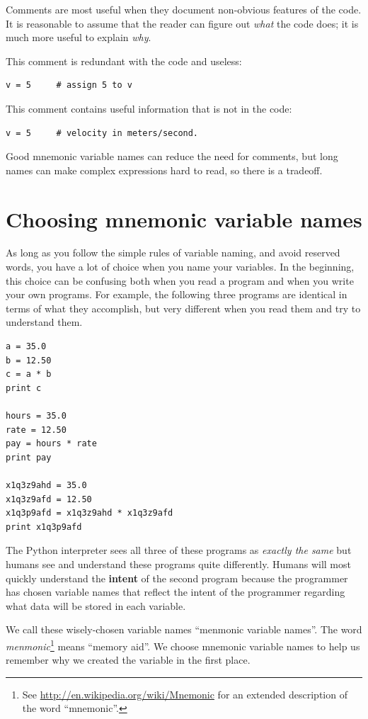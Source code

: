 \documentclass[10pt]{book}
\begin{document}
Comments are most useful when they document non-obvious features of
the code.  It is reasonable to assume that the reader can figure out
{\em what} the code does; it is much more useful to explain {\em why}.

This comment is redundant with the code and useless:

\beforeverb
\begin{verbatim}
v = 5     # assign 5 to v
\end{verbatim}
\afterverb
%
This comment contains useful information that is not in the code:

\beforeverb
\begin{verbatim}
v = 5     # velocity in meters/second. 
\end{verbatim}
\afterverb
%
Good mnemonic variable names can reduce the need for comments, but
long names can make complex expressions hard to read, so there is
a tradeoff.

\section{Choosing mnemonic variable names}


As long as you follow the simple rules of variable naming, and avoid
reserved words, you have a lot of choice when you name your variables.
In the beginning, this choice can be confusing both when you read a 
program and when you write your own programs.  For example, the
following three programs are identical in terms of what they accomplish,
but very different when you read them and try to understand them.

\beforeverb
\begin{verbatim}
a = 35.0
b = 12.50
c = a * b
print c

hours = 35.0
rate = 12.50
pay = hours * rate
print pay

x1q3z9ahd = 35.0
x1q3z9afd = 12.50
x1q3p9afd = x1q3z9ahd * x1q3z9afd
print x1q3p9afd
\end{verbatim}
\afterverb
%
The Python interpreter sees all three of these programs as {\em exactly the 
same} but humans see and understand these programs quite differently.  
Humans will most quickly understand the {\bf intent} 
of the second program because the 
programmer has chosen variable names that reflect the intent of the programmer
regarding what data will be stored in each variable.

We call these wisely-chosen variable names ``menmonic variable names''.  The
word {\em menmonic}\footnote{See 
\url{http://en.wikipedia.org/wiki/Mnemonic}
for an extended description of the word ``mnemonic''.} 
means ``memory aid''.
We choose mnemonic variable names to help us remember why we created the variable
in the first place.
\end{document}
